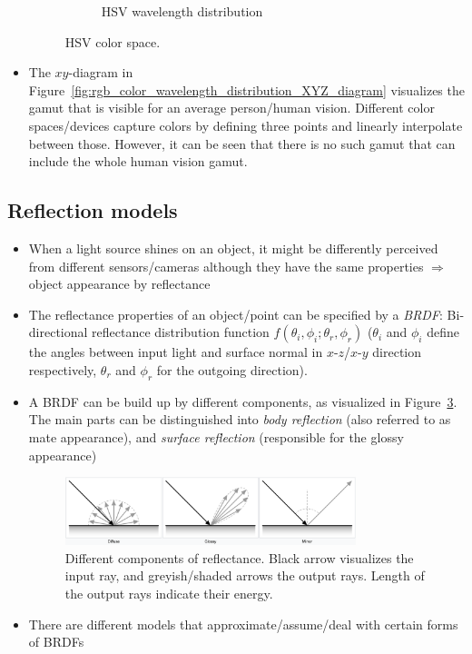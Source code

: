 \begin{itemize}
\begin{figure}[ht!]
\begin{subfigure}[b]{0.4\textwidth}
			\caption{HSV wavelength distribution}
			\label{fig:rgb_color_HSV_wavelength_dist}
		\end{subfigure}
		\caption{HSV color space. }
	\end{figure}
	\item The $xy$-diagram in Figure~\ref{fig:rgb_color_wavelength_distribution_XYZ_diagram} visualizes the gamut that is visible for an average person/human vision. Different color spaces/devices capture colors by defining three points and linearly interpolate between those. However, it can be seen that there is no such gamut that can include the whole human vision gamut.
\end{itemize}
\subsection{Reflection models}
\begin{itemize}
	\item When a light source shines on an object, it might be differently perceived from different sensors/cameras although they have the same properties $\Rightarrow$ object appearance by reflectance
	\item The reflectance properties of an object/point can be specified by a \textit{BRDF}: Bi-directional reflectance distribution function $f(\theta_i, \phi_i; \theta_r, \phi_r)$ ($\theta_i$ and $\phi_i$ define the angles between input light and surface normal in $x$-$z$/$x$-$y$ direction respectively, $\theta_r$ and $\phi_r$ for the outgoing direction).
	\item A BRDF can be build up by different components, as visualized in Figure~\ref{fig:reflection_models_brdf_reflection_components}. The main parts can be distinguished into \textit{body reflection} (also referred to as mate appearance), and \textit{surface reflection} (responsible for the glossy appearance)
	\begin{figure}[ht!]
		\centering
		\includegraphics[width=0.8\textwidth]{figures/cv_image_formation_reflectance_properties.png}
		\caption{Different components of reflectance. Black arrow visualizes the input ray, and greyish/shaded arrows the output rays. Length of the output rays indicate their energy. }
		\label{fig:reflection_models_brdf_reflection_components}
	\end{figure}
	\item There are different models that approximate/assume/deal with certain forms of BRDFs
\end{itemize}
